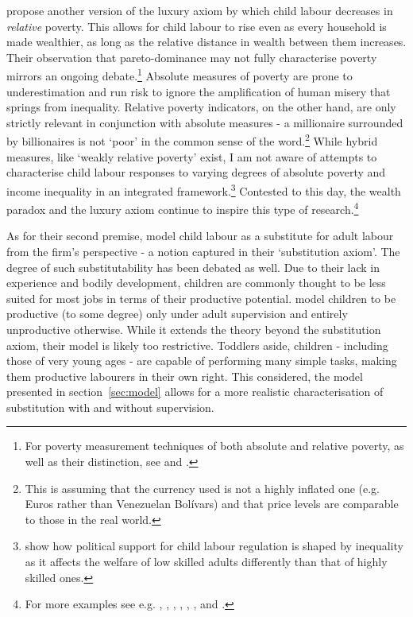 \documentclass[a4paper,12pt]{article}
\theoremstyle{plain}
\theoremstyle{definition}
\theoremstyle{definition}
\theoremstyle{definition}
\theoremstyle{definition}
\begin{document}
\citet{Dwibedi2017} propose another version of the luxury axiom by which child labour decreases in \textit{relative} poverty. This allows for child labour to rise even as every household is made wealthier, as long as the relative distance in wealth between them increases. Their observation that pareto-dominance may not fully characterise poverty mirrors an ongoing debate.\footnote{For poverty measurement techniques of both absolute and relative poverty, as well as their distinction, see \citet{Sen1976} and \citet{Ravallion2020}.} Absolute measures of poverty are prone to underestimation and run risk to ignore the amplification of human misery that springs from inequality. Relative poverty indicators, on the other hand, are only strictly relevant in conjunction with absolute measures - a millionaire surrounded by billionaires is not `poor' in the common sense of the word.\footnote{This is assuming that the currency used is not a highly inflated one (e.g. Euros rather than Venezuelan Bolívars) and that price levels are comparable to those in the real world.} While hybrid measures, like `weakly relative poverty' \citep{Ravallion2009} exist, I am not aware of attempts to characterise child labour responses to varying degrees of absolute poverty and income inequality in an integrated framework.\footnote{\citet{DAlessandro2016} show how political support for child labour regulation is shaped by inequality as it affects the welfare of low skilled adults differently than that of highly skilled ones.} Contested to this day, the wealth paradox and the luxury axiom continue to inspire this type of research.\footnote{For more examples see e.g. \citet{Dumas2007}, \citet{DelCarpio2008}, \citet{DelCarpio2012}, \citet{Edmonds2012}, \citet{Sarkar2016}, \citet{Oryoie2017}, and \citet{Noack2019}.}

As for their second premise, \citet{Basu1998} model child labour as a substitute for adult labour from the firm's perspective - a notion captured in their `substitution axiom'. The degree of such substitutability has been debated as well. Due to their lack in experience and bodily development, children are commonly thought to be less suited for most jobs in terms of their productive potential. \citet{Bar2009} model children to be productive (to some degree) only under adult supervision and entirely unproductive otherwise. While it extends the theory beyond the substitution axiom, their model is likely too restrictive. Toddlers aside, children - including those of very young ages - are capable of performing many simple tasks, making them productive labourers in their own right. This considered, the model presented in section~\ref{sec:model} allows for a more realistic characterisation of substitution with and without supervision.
\end{document}
